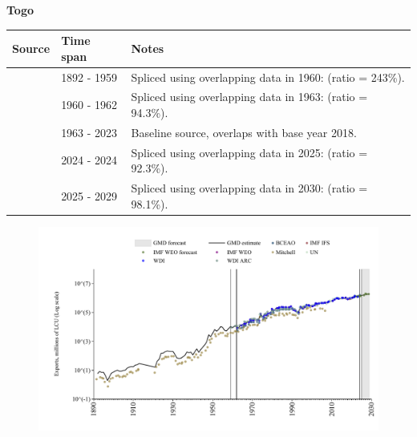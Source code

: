 \documentclass[12pt,a4paper,landscape]{article}
\begin{document}
\begin{adjustbox}{max totalsize={\paperwidth}{\paperheight},center}
\begin{minipage}[t][\textheight][t]{\textwidth}
\vspace*{0.5cm}
{}
\begin{center}
{\Large\bfseries Togo}
\end{center}
\vspace{0.5cm}
\begin{table}[H]
\centering
\small
\begin{tabular}{|l|l|l|}
\hline
\textbf{Source} & \textbf{Time span} & \textbf{Notes} \\
\hline
\rowcolor{white}\cite{Mitchell}& 1892 - 1959 &Spliced using overlapping data in 1960: (ratio = 243\%).\\
\rowcolor{lightgray}\cite{WDI_ARC}& 1960 - 1962 &Spliced using overlapping data in 1963: (ratio = 94.3\%).\\
\rowcolor{white}\cite{WDI}& 1963 - 2023 &Baseline source, overlaps with base year 2018.\\
\rowcolor{lightgray}\cite{BCEAO}& 2024 - 2024 &Spliced using overlapping data in 2025: (ratio = 92.3\%).\\
\rowcolor{white}\cite{IMF_WEO_forecast}& 2025 - 2029 &Spliced using overlapping data in 2030: (ratio = 98.1\%).\\
\hline
\end{tabular}
\end{table}
\begin{figure}[H]
\centering
\includegraphics[width=\textwidth,height=0.6\textheight,keepaspectratio]{graphs/TGO_exports.pdf}
\end{figure}
\end{minipage}
\end{adjustbox}
\end{document}

